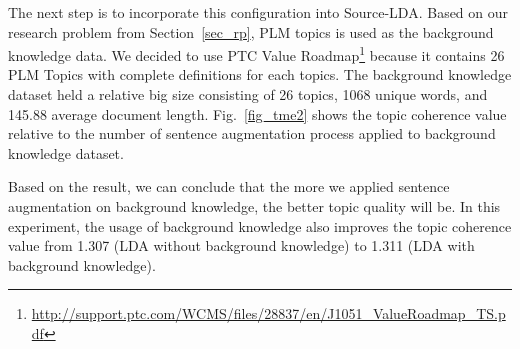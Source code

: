 \documentclass[conference]{IEEEtran}
\begin{document}
The next step is to incorporate this configuration into  Source-LDA. Based on our research problem from Section~\ref{sec_rp}, PLM topics is used as the background knowledge data. We decided to use PTC Value Roadmap\footnote{\url{http://support.ptc.com/WCMS/files/28837/en/J1051_ValueRoadmap_TS.pdf}} because it contains 26 PLM Topics with complete definitions for each topics. The background knowledge dataset held a relative big size consisting of 26 topics, 1068 unique words, and 145.88 average document length. Fig.~\ref{fig_tme2} shows the topic coherence value relative to the number of sentence augmentation process applied to background knowledge dataset.

Based on the result, we can conclude that the more we applied sentence augmentation on background knowledge, the better topic quality will be. In this experiment, the usage of background knowledge also improves the topic coherence value from 1.307 (LDA without background knowledge) to 1.311 (LDA with background knowledge).

\begin{table}[b]
\caption{Augmented Dataset Characteristics}
\label{table 3: augmented dataset characteristics}
\end{table}
\end{document}
